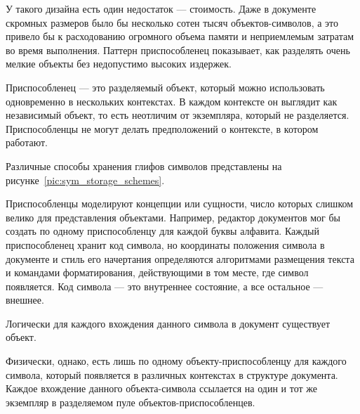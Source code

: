 У такого дизайна есть один недостаток --- стоимость.
Даже в документе скромных размеров было бы несколько сотен тысяч объектов-символов,
а это привело бы к расходованию огромного объема памяти и неприемлемым затратам во время
выполнения. Паттерн приспособленец показывает, как разделять очень мелкие
объекты без недопустимо высоких издержек.

Приспособленец --- это разделяемый объект, который можно использовать
одновременно в нескольких контекстах. В каждом контексте он выглядит как
независимый объект, то есть неотличим от экземпляра, который не разделяется.
Приспособленцы не могут делать предположений о контексте, в котором работают.

Различные способы хранения глифов символов представлены на рисунке~\ref{pic:sym_storage_schemes}. 

Приспособленцы моделируют концепции или сущности, число которых
слишком велико для представления объектами.
Например, редактор документов мог бы создать по одному приспособленцу для
каждой буквы алфавита. Каждый приспособленец хранит код символа, но координаты
положения символа в документе и стиль его начертания определяются алгоритмами
размещения текста и командами форматирования, действующими в том месте,
где символ появляется. Код символа --- это внутреннее состояние, а все остальное --- внешнее.

Логически для каждого вхождения данного символа в документ существует
объект.

Физически, однако, есть лишь по одному объекту-приспособленцу для каждого
символа, который появляется в различных контекстах в структуре документа.
Каждое вхождение данного объекта-символа ссылается на один и тот же экземпляр в
разделяемом пуле объектов-приспособленцев.

